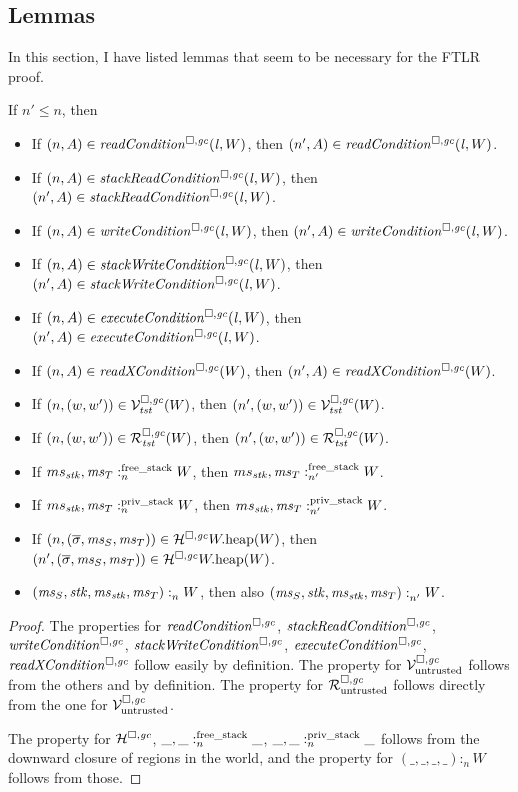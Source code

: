 \subsection{Lemmas}
In this section, I have listed lemmas that seem to be necessary for the FTLR proof.
\begin{lemma}
  \label{lem:downwards-closed}
  If $n' \leq n$, then
  \begin{itemize}
  \item If $\npair{A} \in \readCond{\lin,W}$, then $\npair[n']{A} \in \readCond{\lin,W}$.
  \item If $\npair{A} \in \stackReadCond{\lin,W}$, then $\npair[n']{A} \in \stackReadCond{\lin,W}$.
  \item If $\npair{A} \in \writeCond{\lin,W}$, then $\npair[n']{A} \in \writeCond{\lin,W}$.
  \item If $\npair{A} \in \stackWriteCond{\lin,W}$, then $\npair[n']{A} \in \stackWriteCond{\lin,W}$.
  \item If $\npair{A} \in \execCond{\lin,W}$, then $\npair[n']{A} \in \execCond{\lin,W}$.
  \item If $\npair{A} \in \xReadCond{W}$, then $\npair[n']{A} \in \xReadCond{W}$.
  \item If $\npair{(w,w')} \in \lrvg{\trust}(W)$, then $\npair[n']{(w,w')} \in \lrvg{\trust}(W)$.
  \item If $\npair{(w,w')} \in \lrrg{\trust}(W)$, then $\npair[n']{(w,w')} \in \lrrg{\trust}(W)$.
  \item If $\memSatFStack{ms_\stk,\ms_T}{W}$, then $\memSatFStack[n']{ms_\stk,\ms_T}{W}$.
  \item If $\memSatStack{ms_\stk,\ms_T}{W}$, then $\memSatStack[n']{ms_\stk,\ms_T}{W}$.
  \item If $\npair{(\overline{\sigma},\ms_S,\ms_T)} \in \lrheap{\pwheap}(W)$, then $\npair[n']{(\overline{\sigma},\ms_S,\ms_T)} \in \lrheap{\pwheap}(W)$.
  \item $\memSat{(\ms_S,\stk,\ms_\stk,\ms_T)}{W}$, then also $\memSat[n']{(\ms_S,\stk,\ms_\stk,\ms_T)}{W}$.
  \end{itemize}
\end{lemma}
\begin{proof}
  The properties for $\readCond{}$, $\stackReadCond{}$, $\writeCond{}$, $\stackWriteCond{}$, $\execCond{}$, $\xReadCond{}$ follow easily by definition.
  The property for $\lrv$ follows from the others and by definition.
  The property for $\lrr$ follows directly from the one for $\lrv$.
  
  The property for $\lrheap$, $\memSatFStack{\_,\_}{\_}$, $\memSatStack{\_,\_}{\_}$ follows from the downward closure of regions in the world, and the property for $(\_,\_,\_,\_) :_n W$ follows from those.
\end{proof}


